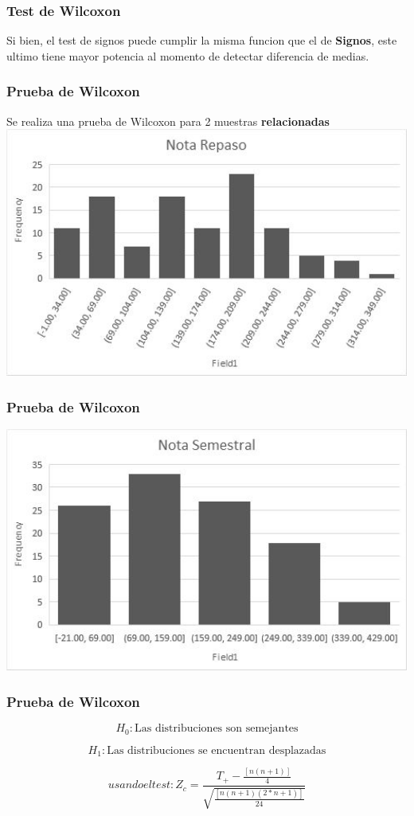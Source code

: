 \begin{frame}
    \frametitle{Test de Wilcoxon}
    Si bien, el test de signos puede cumplir la misma funcion que el de
    \textbf{Signos}, este ultimo tiene mayor potencia al momento de
    detectar diferencia de medias.
  
\end{frame}

\begin{frame}
    \frametitle{Prueba de Wilcoxon}
    Se realiza una prueba de Wilcoxon para 2 muestras
    \textbf{relacionadas} 
    \includegraphics[width=1\textwidth]{cap/images/wilcoxon/repaso.jpg}
\end{frame}

\begin{frame}
    \frametitle{Prueba de Wilcoxon}
    \includegraphics[width=1\textwidth]{cap/images/wilcoxon/semestral.jpg}
\end{frame}

\begin{frame}

    \frametitle{Prueba de Wilcoxon}

    \[H_0: \textrm{Las distribuciones son semejantes}\]
    
    \[H_1: \textrm{Las distribuciones se encuentran desplazadas}\]

    \[usando el test: Z_c = \frac{T_+ - \frac{[n(n + 1)]}{4}}{\sqrt{\frac{[n(n + 1)(2 * n + 1)]}{24}}}\]

\end{frame}

